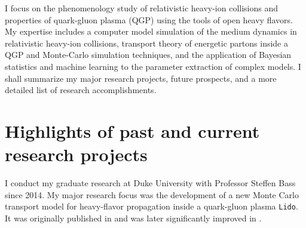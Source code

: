 \documentclass[12pt,a4paper]{revtex4-1}
\begin{document}
I focus on the phenomenology study of relativistic heavy-ion collisions and properties of quark-gluon plasma (QGP) using the tools of open heavy flavors.
My expertise includes a computer model simulation of the medium dynamics in relativistic heavy-ion collisions, transport theory of energetic partons inside a QGP and Monte-Carlo simulation techniques, and the application of Bayesian statistics and machine learning to the parameter extraction of complex models.
I shall summarize my major research projects, future prospects, and a more detailed list of research accomplishments.


\section*{Highlights of past and current research projects}
I conduct my graduate research at Duke University with Professor Steffen Bass since 2014.
My major research focus was the development of a new Monte Carlo transport model for heavy-flavor propagation inside a quark-gluon plasma {\tt Lido}. It was originally published in \cite{Ke:2018tsh} and was later significantly improved in \cite{Ke:2018jem}.
\end{document}
